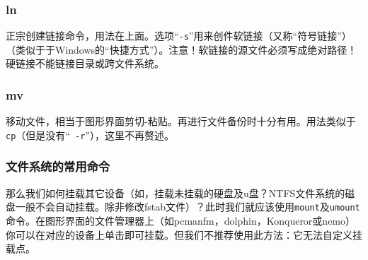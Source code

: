 \subsubsection{ln}
\cite{ln}\par
正宗创建链接命令，用法在上面。选项“\verb|-s|”用来创件软链接（又称“符号链接”）（类似于于Windows的“快捷方式”）。注意！软链接的源文件必须写成绝对路径！硬链接不能链接目录或跨文件系统。
\subsubsection{mv}
移动文件，相当于图形界面剪切-粘贴。再进行文件备份时十分有用。用法类似于\verb|cp|（但是没有“\verb| -r|”），这里不再赘述。
\subsubsection{文件系统的常用命令}
那么我们如何挂载其它设备（如，挂载未挂载的硬盘及u盘？NTFS文件系统的磁盘一般不会自动挂载。除非修改fstab文件）？此时我们就应该使用\verb|mount|及\verb|umount|命令。在图形界面的文件管理器上（如pcmanfm，dolphin，Konqueror或nemo）你可以在对应的设备上单击即可挂载。但我们不推荐使用此方法：它无法自定义挂载点。\par
